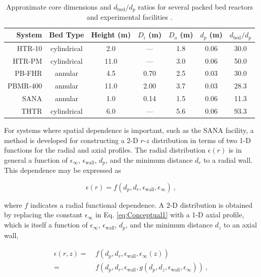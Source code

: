 \begin{table}[!h]
\caption{Approximate core dimensions and \(d_\text{bed}/d_p\) ratios for several packed bed reactors and experimental facilities \cite{gao,htrpm,pbfhr,boer,SANA,thtr_1990}.}
\centering
\begin{tabular}{|r |c| c c c c c|}
\hline\hline
System & Bed Type & Height (m) & \(D_i\) (m) & \(D_o\) (m) & \(d_p\) (m) & \(d_\text{bed}/d_p\)\Tstrut\Bstrut \\
\hline
HTR-10 & cylindrical & \hspace{0.5em}2.0 & --- & 1.8 & 0.06 & 30.0\Tstrut\\
HTR-PM & cylindrical & 11.0 & --- & 3.0 & 0.06 & 50.0\\
PB-FHR & annular & \hspace{0.5em}4.5 & 0.70 & 2.5 & 0.03 & 30.0\\
PBMR-400 & annular & 11.0 & 2.0\color{white}0\color{black}& 3.7 & 0.03 & 28.3\\
SANA & annular & \hspace{0.5em}1.0 & 0.14 & 1.5 & 0.06 & 11.3\\
THTR & cylindrical & \hspace{0.5em}6.0 & --- & 5.6 & 0.06 & 93.3\Bstrut\\
\hline
\end{tabular}
\label{table:DpDbed}
\end{table}

For systems where spatial dependence is important, such as the SANA facility, a method is developed for constructing a 2-D \(r\)-\(z\) distribution in terms of two 1-D functions for the radial and axial profiles. The radial distribution \(\epsilon(r)\) is in general a function of \(\epsilon_\infty\), \(\epsilon_\text{wall}\), \(d_p\), and the minimum distance \(d_r\) to a radial wall. This dependence may be expressed as

\begin{equation}
\label{eq:Conceptual1}
\epsilon(r)=f\left(d_p, d_r, \epsilon_\text{wall},\epsilon_\infty\right)\ ,
\end{equation}

\noindent where \(f\) indicates a radial functional dependence. A 2-D distribution is obtained by replacing the constant \(\epsilon_\infty\) in Eq. \eqref{eq:Conceptual1} with a 1-D axial profile, which is itself a function of \(\epsilon_\infty\), \(\epsilon_\text{wall}\), \(d_p\), and the minimum distance \(d_z\) to an axial wall,

\begin{equation}
\begin{aligned}
\label{eq:Conceptual}
\epsilon(r,z)=&\ f\left(d_p, d_r, \epsilon_\text{wall}, \epsilon_\infty(z)\right)\\
=&\ f\left(d_p, d_r, \epsilon_\text{wall}, g\left(d_p, d_z, \epsilon_\text{wall}, \epsilon_\infty\right)\right)\ ,
\end{aligned}
\end{equation}

